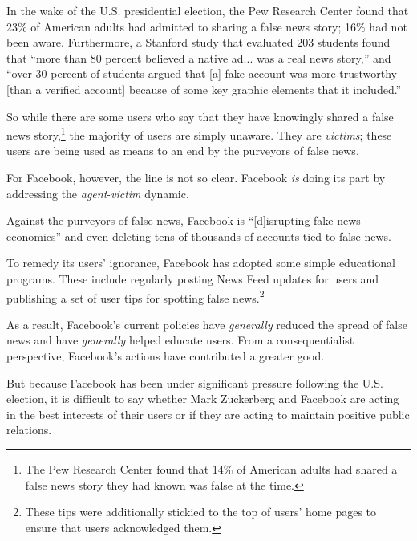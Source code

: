 \par In the wake of the U.S. presidential election, the Pew Research Center found that 23\% of American adults had admitted to sharing a false news story; 16\% had not been aware. \cite{pew_confusion} Furthermore, a Stanford study that evaluated 203 students found that ``more than 80 percent believed a native ad... was a real news story,'' and ``over 30 percent of students argued that [a] fake account was more trustworthy [than a verified account] because of some key graphic elements that it included.'' \cite{stanford_credibility}

\par So while there are some users who say that they have knowingly shared a false news story,\footnote{The Pew Research Center found that 14\% of American adults had shared a false news story they had known was false at the time.\cite{pew_confusion}} \cite{pew_confusion} the majority of users are simply unaware. They are \emph{victims}; these users are being used as means to an end by the purveyors of false news.


\par For Facebook, however, the line is not so clear. Facebook \emph{is} doing its part by addressing the \emph{agent}-\emph{victim} dynamic. 

\par Against the purveyors of false news, Facebook is ``[d]isrupting fake news economics'' \cite{zuck_resp_b} and even deleting tens of thousands of accounts tied to false news. \cite{telegraph_delete}

\par To remedy its users' ignorance, Facebook has adopted some simple educational programs. These include regularly posting News Feed updates for users \cite{fb_hoaxes_2016} and publishing a set of user tips for spotting false news.\footnote{These tips were additionally stickied to the top of users' home pages to ensure that users acknowledged them.\cite{guardian_tips}} \cite{guardian_tips}

\par As a result, Facebook's current policies have \emph{generally} reduced the spread of false news \cite{guardian_steps} and have \emph{generally} helped educate users. \cite{guardian_steps} From a consequentialist perspective, Facebook's actions have contributed a greater good.

\par But because Facebook has been under significant pressure following the U.S. election, \cite{tc_snowden} it is difficult to say whether Mark Zuckerberg and Facebook are acting in the best interests of their users or if they are acting to maintain positive public relations.

